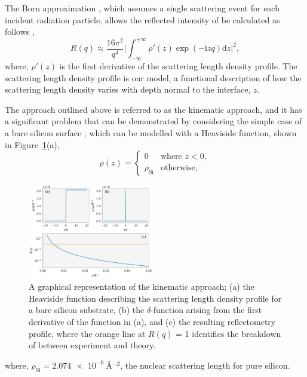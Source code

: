\documentclass[
 reprint,
 superscriptaddress,
 amsmath,amssymb,
 aps,
]{revtex4-2}
\begin{document}
The Born approximation \cite{born_quantenmechanik_1926}, which assumes a single scattering event for each incident radiation particle, allows the reflected intensity of be calculated as follows \cite{sivia_elementary_2011},
%
\begin{equation}
    R(q) \approx \frac{16\pi^2}{q^4} \bigg| \int^{+\infty}_{-\infty}{\rho'(z)\exp{(-\mathrm{i} zq) \text{d}z} \bigg|^2},
    \label{equ:kine}
\end{equation}
%
where, $\rho'(z)$ is the first derivative of the scattering length density profile.
The scattering length density profile is our model, a functional description of how the scattering length density varies with depth normal to the interface, $z$.

The approach outlined above is referred to as the kinematic approach, and it has a significant problem that can be demonstrated by considering the simple case of a bare silicon surface \cite{sivia_elementary_2011}, which can be modelled with a Heaviside function, shown in Figure~\ref{fig:kine}(a),
%
\begin{equation}
    \rho(z) = 
    \begin{cases}
        0 & \text{where } z < 0,\\
        \rho_{\text{Si}} & \text{otherwise},
    \end{cases}
\end{equation}
%
%
\begin{figure}[t]
    \forceversofloat
    \includegraphics[width=0.49\textwidth]{kine}
    \caption{A graphical representation of the kinematic approach; (a) the Heaviside function describing the scattering length density profile for a bare silicon substrate, (b) the $\delta$-function arising from the first derivative of the function in (a), and (c) the resulting reflectometry profile, where the orange line at $R(q)$ = 1 identifies the breakdown of between experiment and theory.}
    \label{fig:kine}
\end{figure}
%
where, $\rho_{\text{Si}} = \SI{2.074e-6}{\angstrom^{-2}}$, the nuclear scattering length for pure silicon. 
\end{document}

